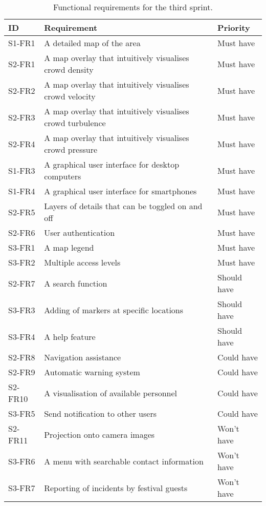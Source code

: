 \begin{table}[htbp]
	\centering
	\begin{tabularx}{\textwidth}{lXl}
		\toprule
		\textbf{ID} & \textbf{Requirement} & \textbf{Priority} \\
		\midrule 
		\rowcolor[HTML]{EFEFEF} 
		S1-FR1 & A detailed map of the area & Must have \\
		S2-FR1 & A map overlay that intuitively visualises crowd density & Must have \\
		\rowcolor[HTML]{EFEFEF} 
		S2-FR2 & A map overlay that intuitively visualises crowd velocity & Must have \\
		S2-FR3 & A map overlay that intuitively visualises crowd turbulence & Must have \\
		\rowcolor[HTML]{EFEFEF} 
		S2-FR4 & A map overlay that intuitively visualises crowd pressure & Must have \\
		S1-FR3 & A graphical user interface for desktop computers & Must have \\
		\rowcolor[HTML]{EFEFEF} 
		S1-FR4 & A graphical user interface for smartphones & Must have \\
		S2-FR5 & Layers of details that can be toggled on and off & Must have \\
		\rowcolor[HTML]{EFEFEF} 
		S2-FR6 & User authentication & Must have \\
		S3-FR1 & A map legend & Must have \\
		\rowcolor[HTML]{EFEFEF}
		S3-FR2 & Multiple access levels & Must have \\
		S2-FR7 & A search function & Should have \\
		\rowcolor[HTML]{EFEFEF}
		S3-FR3 & Adding of markers at specific locations & Should have \\
		S3-FR4 & A help feature & Should have \\
		\rowcolor[HTML]{EFEFEF} 
		S2-FR8 & Navigation assistance & Could have \\
		S2-FR9 & Automatic warning system & Could have \\
		\rowcolor[HTML]{EFEFEF} 
		S2-FR10 & A visualisation of available personnel & Could have \\
		S3-FR5 & Send notification to other users & Could have \\
		\rowcolor[HTML]{EFEFEF}
		S2-FR11 & Projection onto camera images & Won't have \\
		S3-FR6 & A menu with searchable contact information & Won't have \\
		\rowcolor[HTML]{EFEFEF}
		S3-FR7 & Reporting of incidents by festival guests & Won't have \\
		\bottomrule
	\end{tabularx}
	\caption{Functional requirements for the third sprint.}
	\label{tab:s3_req}
\end{table}

